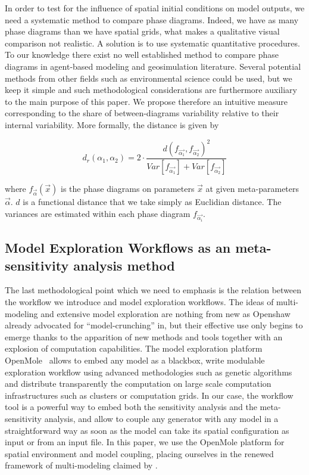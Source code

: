 \documentclass[Afour,sageh,times]{sagej}
\begin{document}
In order to test for the influence of spatial initial conditions on model outputs, we need a systematic method to compare phase diagrams. Indeed, we have as many phase diagrams than we have spatial grids, what makes a qualitative visual comparison not realistic. A solution is to use systematic quantitative procedures. To our knowledge there exist no well established method to compare phase diagrams in agent-based modeling and geosimulation literature. Several potential methods from other fields such as environmental science could be used, but we keep it simple and such methodological considerations are furthermore auxiliary to the main purpose of this paper. We propose therefore an intuitive measure corresponding to the share of between-diagrams variability relative to their internal variability. More formally, the distance is given by

\begin{equation}\label{eq:phase-distance}
d_r\left(\alpha_1,\alpha_2\right) = 2 \cdot \frac{d(f_{\vec{\alpha_1}},f_{\vec{\alpha_2}})^2}{Var\left[f_{\vec{\alpha_1}}\right] + Var\left[f_{\vec{\alpha_2}}\right]}
\end{equation}

where $f_{\vec{\alpha}}(\vec{x})$ is the phase diagrams on parameters $\vec{x}$ at given meta-parameters $\vec{\alpha}$. $d$ is a functional distance that we take simply as Euclidian distance. The variances are estimated within each phase diagram $f_{\vec{\alpha_i}}$.


\subsection{Model Exploration Workflows as an meta-sensitivity analysis method}

The last methodological point which we need to emphasis is the relation between the workflow we introduce and model exploration workflows. The ideas of multi-modeling and extensive model exploration are nothing from new as Openshaw already advocated for ``model-crunching'' in, but their effective use only begins to emerge thanks to the apparition of new methods and tools together with an explosion of computation capabilities. The model exploration platform OpenMole~\citep{reuillon2013openmole} allows to embed any model as a blackbox, write modulable exploration workflow using advanced methodologies such as genetic algorithms and distribute transparently the computation on large scale computation infrastructures such as clusters or computation grids. In our case, the workflow tool is a powerful way to embed both the sensitivity analysis and the meta-sensitivity analysis, and allow to couple any generator with any model in a straightforward way as soon as the model can take its spatial configuration as input or from an input file. In this paper, we use the OpenMole platform for spatial environment and model coupling, placing ourselves in the renewed framework of multi-modeling claimed by \cite{cottineau2016back}.
\end{document}
